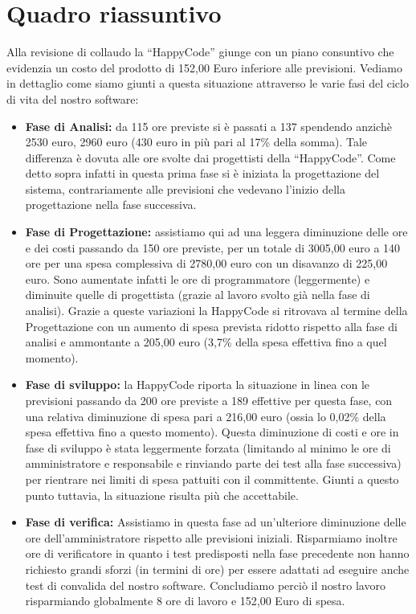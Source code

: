 \chapter{Quadro riassuntivo}
Alla revisione di collaudo la ``HappyCode'' giunge con un piano consuntivo che evidenzia un costo del prodotto di 152,00 Euro inferiore alle previsioni. Vediamo in dettaglio come siamo giunti a questa situazione attraverso le varie fasi del ciclo di vita del nostro software:
\begin{itemize}
\item \textbf{Fase di Analisi:} da 115 ore previste si \`e passati a 137 spendendo anzich\`e 2530 euro, 2960 euro (430 euro in pi\`u pari al 17\% della somma). Tale differenza \`e dovuta alle ore svolte dai progettisti della ``HappyCode''. Come detto sopra infatti in questa prima fase si \`e iniziata la progettazione del sistema, contrariamente alle previsioni che vedevano l'inizio della progettazione nella fase successiva.
\item \textbf{Fase di Progettazione:} assistiamo qui ad una leggera diminuzione delle ore e dei costi passando da 150 ore previste, per un totale di 3005,00 euro a 140 ore per una spesa complessiva di 2780,00 euro con un disavanzo di 225,00 euro. Sono aumentate infatti le ore di programmatore (leggermente) e diminuite quelle di progettista (grazie al lavoro svolto gi\`a nella fase di analisi). Grazie a queste variazioni la HappyCode si ritrovava al termine della Progettazione con un aumento di spesa prevista ridotto rispetto alla fase di 
analisi e ammontante a 205,00 euro (3,7\% della spesa effettiva fino a quel momento).
\item \textbf{Fase di sviluppo:} la HappyCode riporta la situazione in linea con le previsioni passando da 200 ore previste a 189 effettive per questa fase, con una relativa diminuzione di spesa pari a 216,00 euro (ossia lo 0,02\% della spesa effettiva fino a questo momento). Questa diminuzione di costi e ore in fase di sviluppo \`e stata leggermente forzata (limitando al minimo le ore di amministratore e responsabile e rinviando parte dei test alla fase successiva) per rientrare nei limiti di spesa pattuiti con il committente. Giunti a questo punto tuttavia, la situazione risulta pi\`u che accettabile.
\item \textbf{Fase di verifica:} Assistiamo in questa fase ad un'ulteriore diminuzione delle ore dell'amministratore rispetto alle previsioni iniziali. Risparmiamo inoltre ore di verificatore in quanto i test predisposti nella fase precedente non hanno richiesto grandi sforzi (in termini di ore) per essere adattati ad eseguire anche test di convalida del nostro software. Concludiamo perci\`o il nostro lavoro risparmiando globalmente 8 ore di lavoro e 152,00 Euro di spesa.
\end{itemize}

